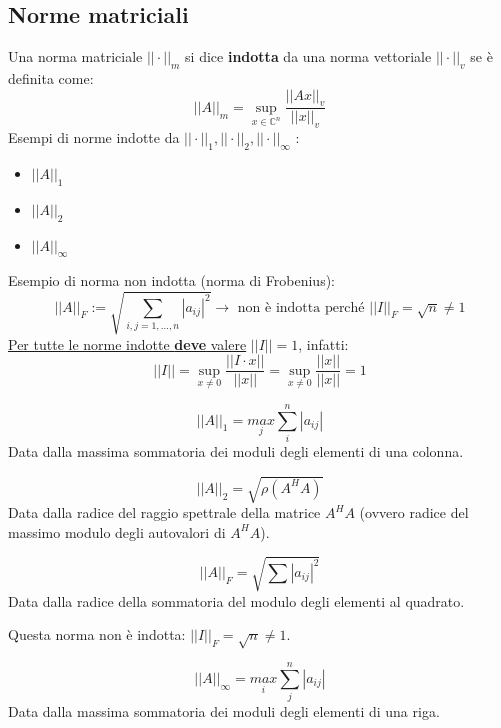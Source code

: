 \documentclass[12pt,a4paper,]{report}
\begin{document}
\subsection{Norme matriciali}
\begin{definizione}
    Una norma matriciale $||\cdot||_m$ si dice \textbf{indotta} da una norma vettoriale $||\cdot||_v$ se è definita come:
    \[
    ||A||_m = \sup_{x \in \mathbb{C}^n} \frac{||Ax||_v}{||x||_v}
    \]
    Esempi di norme indotte da $||\cdot||_1, ||\cdot||_2, ||\cdot||_\infty$ :
    \begin{itemize}
        \item $||A||_1 $        
        \item $||A||_2 $        
        \item $||A||_\infty $ 
    \end{itemize}
    Esempio di norma non indotta (norma di Frobenius):
    \[
    ||A||_F := \sqrt{\sum_{i,j=1,\ldots,n} |a_{ij}|^2} \to\text{ non è indotta perché } ||I||_F = \sqrt{n} \neq 1
    \]
    \uline{Per tutte le norme indotte \textbf{deve} valere} $\boxed{||I|| = 1}$, infatti:
    \[
    ||I|| = \sup_{x \neq 0} \frac{||I \cdot x||}{||x||} = \sup_{x \neq 0} \frac{||x||}{||x||} = 1
    \]
\end{definizione}

\begin{definizione}
    [Norma 1]
    \[
    ||A||_1 = \underset{j}{max} \sum_i^n |a_{ij}|
    \]
    Data dalla massima sommatoria dei moduli degli elementi di una colonna.
\end{definizione}
\begin{definizione}
    [Norma 2]
    \[
    ||A||_2 = \sqrt{\rho (A^HA)}
    \]
    Data dalla radice del raggio spettrale della matrice $A^HA$ (ovvero radice del massimo modulo degli autovalori di $A^HA$).
\end{definizione}
\begin{definizione}
    \[
    ||A||_F = \sqrt{\sum |a_{ij}|^2}
    \]
    Data dalla radice della sommatoria del modulo degli elementi al quadrato.
    \begin{nota}
        Questa norma non è indotta: $||I||_F = \sqrt{n} \neq 1$.
    \end{nota}
\end{definizione}
\begin{definizione}
    \[
    ||A||_\infty = \underset{i}{max} \sum_j^n |a_{ij}|
    \]
    Data dalla massima sommatoria dei moduli degli elementi di una riga.
\end{definizione}
\end{document}
